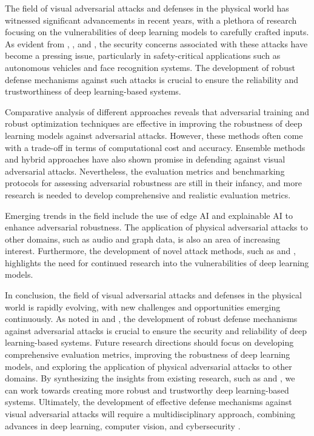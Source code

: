 \documentclass[11pt,a4paper]{article}
\begin{document}
The field of visual adversarial attacks and defenses in the physical world has witnessed significant advancements in recent years, with a plethora of research focusing on the vulnerabilities of deep learning models to carefully crafted inputs. As evident from \cite{doi:10.24963/ijcai.2021/694}, \cite{arxiv:1707.08945}, and \cite{doi:10.1109/access.2018.2807385}, the security concerns associated with these attacks have become a pressing issue, particularly in safety-critical applications such as autonomous vehicles and face recognition systems. The development of robust defense mechanisms against such attacks is crucial to ensure the reliability and trustworthiness of deep learning-based systems.

Comparative analysis of different approaches reveals that adversarial training and robust optimization techniques are effective in improving the robustness of deep learning models against adversarial attacks. However, these methods often come with a trade-off in terms of computational cost and accuracy. Ensemble methods and hybrid approaches have also shown promise in defending against visual adversarial attacks. Nevertheless, the evaluation metrics and benchmarking protocols for assessing adversarial robustness are still in their infancy, and more research is needed to develop comprehensive and realistic evaluation metrics.

Emerging trends in the field include the use of edge AI and explainable AI to enhance adversarial robustness. The application of physical adversarial attacks to other domains, such as audio and graph data, is also an area of increasing interest. Furthermore, the development of novel attack methods, such as \cite{doi:10.1109/vr51125.2022.00073} and \cite{arxiv:2203.08392}, highlights the need for continued research into the vulnerabilities of deep learning models.

In conclusion, the field of visual adversarial attacks and defenses in the physical world is rapidly evolving, with new challenges and opportunities emerging continuously. As noted in \cite{doi:10.1145/3433210.3437513} and \cite{doi:10.1109/jiot.2021.3099164}, the development of robust defense mechanisms against adversarial attacks is crucial to ensure the security and reliability of deep learning-based systems. Future research directions should focus on developing comprehensive evaluation metrics, improving the robustness of deep learning models, and exploring the application of physical adversarial attacks to other domains. By synthesizing the insights from existing research, such as \cite{doi:10.1109/iros51168.2021.9636638} and \cite{doi:10.1109/cvpr42600.2020.01426}, we can work towards creating more robust and trustworthy deep learning-based systems. Ultimately, the development of effective defense mechanisms against visual adversarial attacks will require a multidisciplinary approach, combining advances in deep learning, computer vision, and cybersecurity \cite{doi:10.1109/cvpr42600.2020.00108}.
\end{document}
